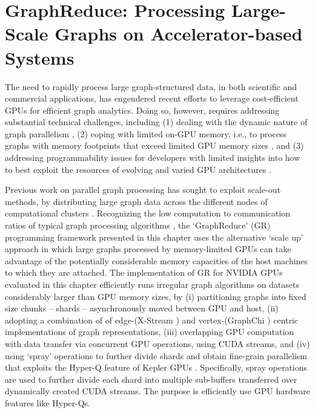 \chapter{GraphReduce: Processing Large-Scale Graphs on Accelerator-based Systems}

The need to rapidly process large graph-structured data, in both scientific and commercial applications, has engendered
recent efforts to leverage cost-efficient GPUs \cite{Rain, Strings} for efficient graph analytics. Doing so, however, requires
addressing substantial technical challenges, including (1) dealing with the dynamic nature of graph parallelism \cite{medusa, mapgraph, cusha, naila}, (2) coping with limited on-GPU memory, i.e., to process graphs with memory footprints
that exceed limited GPU memory sizes \cite{chi, xstream}, and (3) addressing programmability issues for developers with limited
insights into how to best exploit the resources of evolving and varied GPU architectures \cite{ppl,pact,jure}.

Previous work on parallel graph processing has sought to exploit scale-out methods, by distributing
large graph data across the different nodes of computational clusters \cite{graphlab}. Recognizing the low computation to 
communication ratios of typical graph processing algorithms \cite{chi,xstream}, the `GraphReduce' (GR) programming
framework presented in this chapter uses the alternative `scale up' approach in which large graphs processed 
by memory-limited GPUs can take advantage of the potentially considerable memory capacities of the host machines 
to which they are attached. The implementation of GR for NVIDIA GPUs evaluated in this chapter efficiently runs 
irregular graph algorithms on datasets considerably larger than GPU memory sizes, by (i) partitioning graphs into
fixed size chunks -- shards -- asynchronously moved between GPU and host, (ii) adopting a combination of 
of edge-(X-Stream \cite{xstream}) and vertex-(GraphChi \cite{chi}) centric implementations of graph representations,
(iii) overlapping GPU computation with data transfer via concurrent GPU operations, using CUDA streams, and 
(iv) using `spray' operations to further divide shards and obtain fine-grain parallelism that exploits the 
Hyper-Q feature of Kepler GPUs \cite{kepler}. Specifically, spray operations are used to further divide each shard into multiple 
sub-buffers transferred over dynamically created CUDA streams. The purpose is efficiently use GPU hardware features
like Hyper-Qs.

